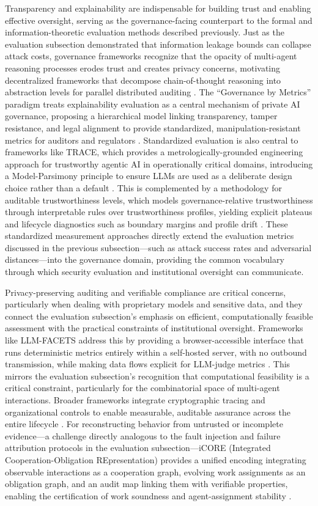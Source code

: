 \documentclass[11pt]{article}
\begin{document}
Transparency and explainability are indispensable for building trust and enabling effective oversight, serving as the governance-facing counterpart to the formal and information-theoretic evaluation methods described previously. Just as the evaluation subsection demonstrated that information leakage bounds can collapse attack costs, governance frameworks recognize that the opacity of multi-agent reasoning processes erodes trust and creates privacy concerns, motivating decentralized frameworks that decompose chain-of-thought reasoning into abstraction levels for parallel distributed auditing \cite{ref472}. The ``Governance by Metrics'' paradigm treats explainability evaluation as a central mechanism of private AI governance, proposing a hierarchical model linking transparency, tamper resistance, and legal alignment to provide standardized, manipulation-resistant metrics for auditors and regulators \cite{ref473}. Standardized evaluation is also central to frameworks like TRACE, which provides a metrologically-grounded engineering approach for trustworthy agentic AI in operationally critical domains, introducing a Model-Parsimony principle to ensure LLMs are used as a deliberate design choice rather than a default \cite{ref474}. This is complemented by a methodology for auditable trustworthiness levels, which models governance-relative trustworthiness through interpretable rules over trustworthiness profiles, yielding explicit plateaus and lifecycle diagnostics such as boundary margins and profile drift \cite{ref475}. These standardized measurement approaches directly extend the evaluation metrics discussed in the previous subsection---such as attack success rates and adversarial distances---into the governance domain, providing the common vocabulary through which security evaluation and institutional oversight can communicate.

Privacy-preserving auditing and verifiable compliance are critical concerns, particularly when dealing with proprietary models and sensitive data, and they connect the evaluation subsection's emphasis on efficient, computationally feasible assessment with the practical constraints of institutional oversight. Frameworks like LLM-FACETS address this by providing a browser-accessible interface that runs deterministic metrics entirely within a self-hosted server, with no outbound transmission, while making data flows explicit for LLM-judge metrics \cite{ref476}. This mirrors the evaluation subsection's recognition that computational feasibility is a critical constraint, particularly for the combinatorial space of multi-agent interactions. Broader frameworks integrate cryptographic tracing and organizational controls to enable measurable, auditable assurance across the entire lifecycle \cite{ref466}. For reconstructing behavior from untrusted or incomplete evidence---a challenge directly analogous to the fault injection and failure attribution protocols in the evaluation subsection---iCORE (Integrated Cooperation-Obligation REpresentation) provides a unified encoding integrating observable interactions as a cooperation graph, evolving work assignments as an obligation graph, and an audit map linking them with verifiable properties, enabling the certification of work soundness and agent-assignment stability \cite{ref477}.
\end{document}
